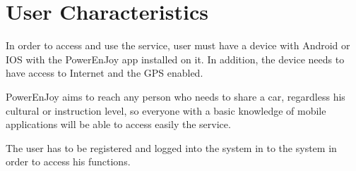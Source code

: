 \section{User Characteristics}
In order to access and use the service, user must have a device with Android or IOS with the PowerEnJoy app installed on it.
In addition, the device needs to have access to Internet and the GPS enabled.

PowerEnJoy aims to reach any person who needs to share a car, regardless his cultural or instruction level, so everyone with a basic knowledge of mobile applications will be able to access easily the service.

The user has to be registered and logged into the system in to the system in order to access his functions.
